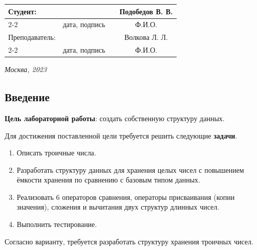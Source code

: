 \documentclass[12pt, a4paper]{article}
\begin{document}
\begin{titlepage}
  \fontsize{14}{21}\selectfont
  \vspace{5cm}


  \noindent\begin{tabularx}{\textwidth}{ X >{\centering}p{4cm} p{1cm} c }
   Студент: & & & Подобедов В. В. \\ \cline{2-2} \cline{4-4}
   & \fontsize{10}{15}\selectfont дата, подпись & & \fontsize{10}{15}\selectfont Ф.И.О. \\
   Преподаватель: & & & Волкова Л. Л.\\ \cline{2-2} \cline{4-4}
   & \fontsize{10}{15}\selectfont дата, подпись & & \fontsize{10}{15}\selectfont Ф.И.О.
  \end{tabularx}

  \vspace{\fill}

  \begin{center}
   \it{Москва}, 2023
  \end{center}

  \thispagestyle{empty}
\end{titlepage}

\renewcommand{\contentsname}{Содержание}
\setcounter{page}{2}
\tableofcontents

\newpage
\begin{center}
   \section*{Введение} 
\end{center}
\justifying

\textbf{Цель лабораторной работы}: создать собственную структуру данных.

Для достижения поставленной цели требуется решить следующие \textbf{задачи}.
\begin{enumerate}
\item Описать троичные числа.
\item Разработать структуру данных для хранения целых чисел с повышением ёмкости хранения по сравнению с базовым типом данных.
\item Реализовать $6$ операторов сравнения, операторы присваивания (копии значения), сложения и вычитания двух структур длинных чисел.
\item Выполнить тестирование.
\end{enumerate}

Согласно варианту, требуется разработать структуру хранения троичных чисел.
\end{document}
